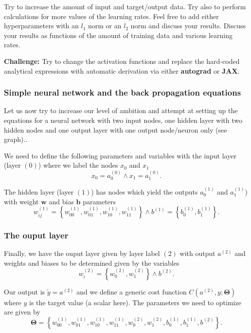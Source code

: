 \documentclass{beamer}
\newenvironment{doconceexercise}{}{}
\newcounter{doconceexercisecounter}
\newcounter{doconce:movie:counter}
\begin{document}
\begin{frame}

\begin{doconceexercise}

                             

Try to increase the amount of input and
target/output data. Try also to perform calculations for more values
of the learning rates. Feel free to add either hyperparameters with an
$l_1$ norm or an $l_2$ norm and discuss your results.
Discuss your results as functions of the amount of training data and various learning rates.

\textbf{Challenge:} Try to change the activation functions and replace the hard-coded analytical expressions with automatic derivation via either \textbf{autograd} or \textbf{JAX}.

\end{doconceexercise}
\end{frame}

\begin{frame}
\frametitle{Simple neural network and the  back propagation equations}

Let us now try to increase our level of ambition and attempt at setting 
up the equations for a neural network with two input nodes, one hidden
layer with two hidden nodes and one output layer with one output node/neuron only (see graph)..

We need to define the following parameters and variables with the input layer (layer $(0)$) 
where we label the  nodes $x_0$ and $x_1$
\[
x_0 = a_0^{(0)} \wedge x_1 = a_1^{(0)}.
\]

The  hidden layer (layer $(1)$) has  nodes which yield the outputs $a_0^{(1)}$ and $a_1^{(1)}$) with  weight $\bm{w}$ and bias $\bm{b}$ parameters
\[
w_{ij}^{(1)}=\left\{w_{00}^{(1)},w_{01}^{(1)},w_{10}^{(1)},w_{11}^{(1)}\right\} \wedge b^{(1)}=\left\{b_0^{(1)},b_1^{(1)}\right\}.
\]
\end{frame}

\begin{frame}
\frametitle{The ouput layer}

Finally, we have the ouput layer given by layer label $(2)$ with output $a^{(2)}$ and weights and biases to be determined given by the variables
\[
w_{i}^{(2)}=\left\{w_{0}^{(2)},w_{1}^{(2)}\right\} \wedge b^{(2)}.
\]

Our output is $\tilde{y}=a^{(2)}$ and we define a generic cost function $C(a^{(2)},y;\bm{\Theta})$ where $y$ is the target value (a scalar here).
The parameters we need to optimize are given by
\[
\bm{\Theta}=\left\{w_{00}^{(1)},w_{01}^{(1)},w_{10}^{(1)},w_{11}^{(1)},w_{0}^{(2)},w_{1}^{(2)},b_0^{(1)},b_1^{(1)},b^{(2)}\right\}.
\]
\end{frame}
\end{document}
